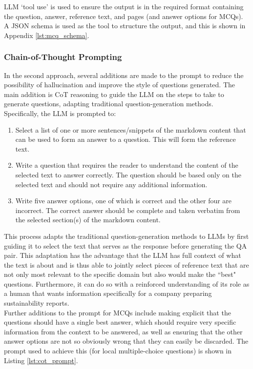 LLM `tool use' is used to ensure the output is in the required format containing the question, answer, reference text, and pages (and answer options for MCQs). A JSON schema is used as the tool to structure the output, and this is shown in Appendix \ref{lst:mcq_schema}.



\subsubsection{Chain-of-Thought Prompting}

In the second approach, several additions are made to the prompt to reduce the possibility of hallucination and improve the style of questions generated. The main addition is CoT reasoning to guide the LLM on the steps to take to generate questions, adapting traditional question-generation methods. Specifically, the LLM is prompted to:

\begin{enumerate}
    \item Select a list of one or more sentences/snippets of the markdown content that can be used to form an answer to a question. This will form the reference text.
    \item Write a question that requires the reader to understand the content of the selected text to answer correctly. The question should be based only on the selected text and should not require any additional information.
    \item Write five answer options, one of which is correct and the other four are incorrect. The correct answer should be complete and taken verbatim from the selected section(s) of the markdown content.
\end{enumerate}


This process adapts the traditional question-generation methods to LLMs by first guiding it to select the text that serves as the response before generating the QA pair. This adaptation has the advantage that the LLM has full context of what the text is about and is thus able to jointly select pieces of reference text that are not only most relevant to the specific domain but also would make the ``best" questions. Furthermore, it can do so with a reinforced understanding of its role as a human that wants information specifically for a company preparing sustainability reports. \\

Further additions to the prompt for MCQs include making explicit that the questions should have a single best answer, which should require very specific information from the context to be answered, as well as ensuring that the other answer options are not so obviously wrong that they can easily be discarded. The prompt used to achieve this (for local multiple-choice questions) is shown in Listing \ref{lst:cot_prompt}. \\

